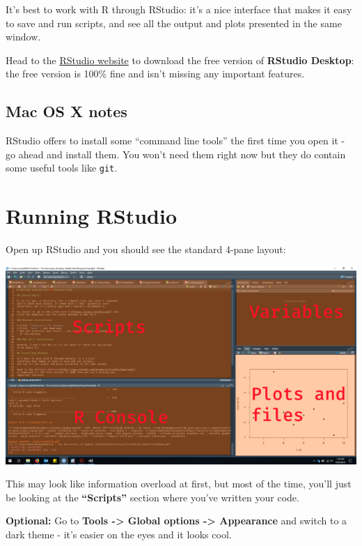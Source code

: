 \documentclass[
]{book}
\begin{document}
It's best to work with R through RStudio: it's a nice
interface that makes it easy to save and run scripts,
and see all the output and plots presented in the same window.

Head to the \href{https://www.rstudio.com/products/rstudio/download/}{RStudio website}
to download the free version of \textbf{RStudio Desktop}: the free version is 100\%
fine and isn't missing any important features.

\hypertarget{mac-os-x-notes}{%
\subsection{Mac OS X notes}\label{mac-os-x-notes}}

RStudio offers to install some ``command line tools'' the first time you
open it - go ahead and install them. You won't need them right now
but they do contain some useful tools like \texttt{git}.

\hypertarget{running-rstudio}{%
\section{Running RStudio}\label{running-rstudio}}

Open up RStudio and you should see the standard 4-pane layout:

\includegraphics{Images/RStudioLayout.png}

This may look like information overload at first, but most of the time, you'll
just be looking at the \textbf{``Scripts''} section where you've written your code.

\begin{note}
\textbf{Optional:} Go to \textbf{Tools -\textgreater{} Global options
-\textgreater{} Appearance} and switch to a dark theme - it's easier on
the eyes and it looks cool.
\end{note}
\end{document}
